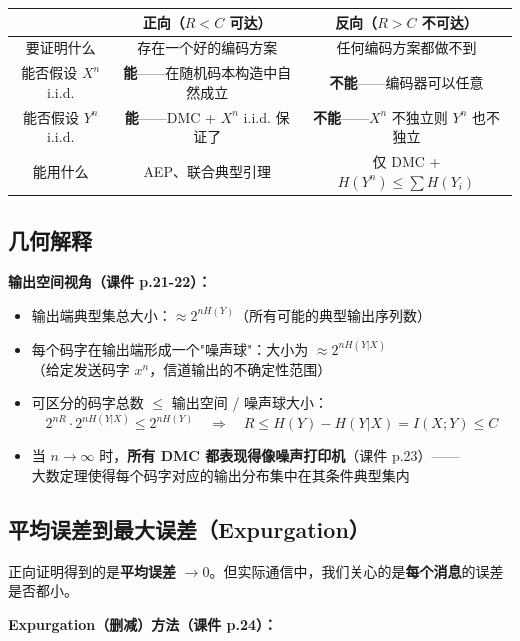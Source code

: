 \documentclass[12pt,a4paper]{ctexart}
\theoremstyle{definition}
\begin{document}
\begin{center}
\begin{tabular}{c|c|c}
\toprule
& 正向（$R<C$ 可达） & 反向（$R>C$ 不可达） \\
\midrule
要证明什么 & 存在一个好的编码方案 & 任何编码方案都做不到 \\
能否假设 $X^n$ i.i.d. & \textbf{能}——在随机码本构造中自然成立 & \textbf{不能}——编码器可以任意 \\
能否假设 $Y^n$ i.i.d. & \textbf{能}——DMC + $X^n$ i.i.d. 保证了 & \textbf{不能}——$X^n$ 不独立则 $Y^n$ 也不独立 \\
能用什么 & AEP、联合典型引理 & 仅 DMC + $H(Y^n)\leq\sum H(Y_i)$ \\
\bottomrule
\end{tabular}
\end{center}


\subsection{几何解释}

\textbf{输出空间视角（课件 p.21-22）：}

\begin{itemize}[nosep]
  \item 输出端典型集总大小：$\approx 2^{nH(Y)}$（所有可能的典型输出序列数）
  \item 每个码字在输出端形成一个"噪声球"：大小为 $\approx 2^{nH(Y|X)}$ \\
  （给定发送码字 $x^n$，信道输出的不确定性范围）
  \item 可区分的码字总数 $\leq$ 输出空间 / 噪声球大小：
  \[
  2^{nR} \cdot 2^{nH(Y|X)} \leq 2^{nH(Y)}
  \quad\Longrightarrow\quad
  R \leq H(Y) - H(Y|X) = I(X;Y) \leq C
  \]
  \item 当 $n \to \infty$ 时，\textbf{所有 DMC 都表现得像噪声打印机}（课件 p.23）—— \\
  大数定理使得每个码字对应的输出分布集中在其条件典型集内
\end{itemize}

\subsection{平均误差到最大误差（Expurgation）}

正向证明得到的是\textbf{平均误差} $\to 0$。但实际通信中，我们关心的是\textbf{每个消息}的误差是否都小。

\textbf{Expurgation（删减）方法（课件 p.24）：}
\end{document}
